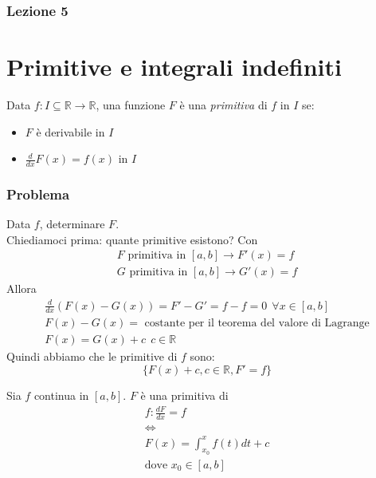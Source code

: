 


\subsubsection{Lezione 5}
\section{Primitive e integrali indefiniti}
\begin{definizione}
    Data $f: I \subseteq \mathbb{R} \to \mathbb{R}$, una funzione $F$ è una \textit{primitiva} di $f$ in $I$ se:
    \begin{itemize}
        \item $F$ è derivabile in $I$
        \item $\frac{d}{dx}F(x)=f(x)$ in $I$
    \end{itemize}
\end{definizione}

\subsubsection{Problema}
Data $f$, determinare $F$. \\
Chiediamoci prima: quante primitive esistono? Con
\begin{gather}
    F \text{ primitiva in } [a,b] \to F'(x)=f \\
    G \text{ primitiva in } [a,b] \to G'(x)=f
\end{gather}
Allora
\begin{gather}
    \frac{d}{dx}(F(x)-G(x))= F'-G' = f-f= 0\ \ \forall x \in [a,b] \\
    F(x)-G(x)= \text{ costante per il teorema del valore di Lagrange} \\
    F(x)=G(x) + c\ \ c \in \mathbb{R}
\end{gather}
Quindi abbiamo che le primitive di $f$ sono:
\begin{equation}
    \{F(x)+c, c\in \mathbb{R}, F'=f\}
\end{equation}

\begin{teorema}
    Sia $f$ continua in $[a,b]$. $F$ è una primitiva di
    \begin{gather*}
        f: \frac{dF}{dx} = f \\
        \iff \\
        F(x) = \int_{x_0}^{x} f(t) dt + c \\
        \text{dove } x_0 \in [a,b]
    \end{gather*}
\end{teorema}

